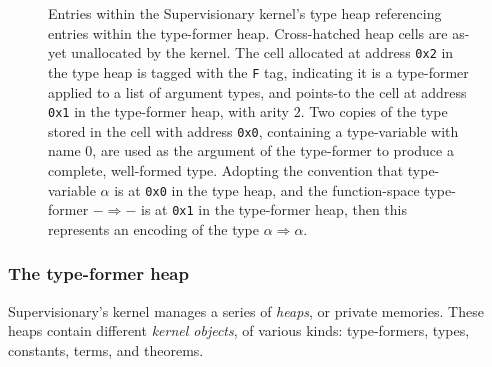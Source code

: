 \documentclass[a4paper, UKenglish, cleveref, autoref, thm-restate]{lipics-v2021}
\begin{document}
\begin{figure}
\caption{Entries within the Supervisionary kernel's type heap referencing entries within the type-former heap.
Cross-hatched heap cells are as-yet unallocated by the kernel.
The cell allocated at address \texttt{0x2} in the type heap is tagged with the \texttt{F} tag, indicating it is a type-former applied to a list of argument types, and points-to the cell at address \texttt{0x1} in the type-former heap, with arity $2$.
Two copies of the type stored in the cell with address \texttt{0x0}, containing a type-variable with name $0$, are used as the argument of the type-former to produce a complete, well-formed type.
Adopting the convention that type-variable $\alpha$ is at \texttt{0x0} in the type heap, and the function-space type-former $- \Rightarrow- $ is at \texttt{0x1} in the type-former heap, then this represents an encoding of the type $\alpha \Rightarrow \alpha$.}
\label{fig.type-former.type.heap}
\end{figure}

\subsubsection*{The type-former heap}

Supervisionary's kernel manages a series of \emph{heaps}, or private memories.
These heaps contain different \emph{kernel objects}, of various kinds: type-formers, types, constants, terms, and theorems.
\end{document}
